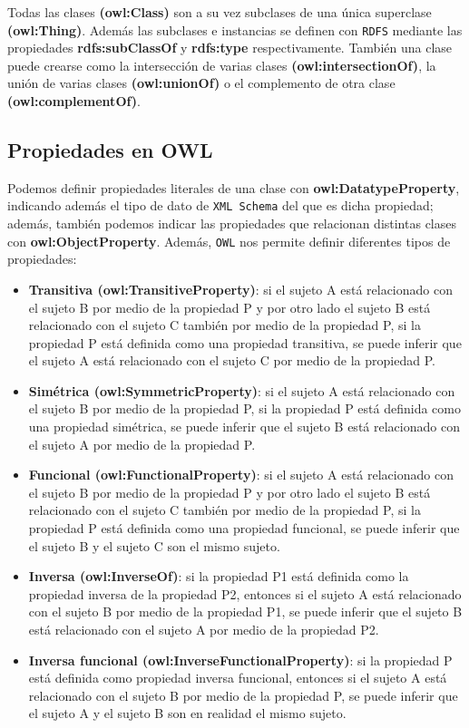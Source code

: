\bigskip

Todas las clases \textbf{(owl:Class)} son a su vez subclases de una única superclase \textbf{(owl:Thing)}. Además las subclases e instancias se definen con {\tt RDFS} mediante las propiedades \textbf{rdfs:subClassOf} y \textbf{rdfs:type} respectivamente. También una clase puede crearse como la intersección de varias clases \textbf{(owl:intersectionOf)}, la unión de varias clases \textbf{(owl:unionOf)} o el complemento de otra clase \textbf{(owl:complementOf)}.

\subsection{Propiedades en OWL}	

Podemos definir propiedades literales de una clase con \textbf{owl:DatatypeProperty}, indicando además el tipo de dato de {\tt XML Schema} del que es dicha propiedad; además, también podemos indicar las propiedades que relacionan distintas clases con \textbf{owl:ObjectProperty}. Además, {\tt OWL}  nos permite definir diferentes tipos de propiedades:

	\begin{itemize}
		\item \textbf{Transitiva (owl:TransitiveProperty)}: si el sujeto A está relacionado con el sujeto B por medio de la propiedad P y por otro lado el sujeto B está relacionado con el sujeto C también por medio de la propiedad P, si la propiedad P está definida como una propiedad transitiva, se puede inferir que el sujeto A está relacionado con el sujeto C por medio de la propiedad P.
		\item \textbf{Simétrica (owl:SymmetricProperty)}: si el sujeto A está relacionado con el sujeto B por medio de la propiedad P, si la propiedad P está definida como una propiedad simétrica, se puede inferir que el sujeto B está relacionado con el sujeto A por medio de la propiedad P.
		\item \textbf{Funcional (owl:FunctionalProperty)}: si el sujeto A está relacionado con el sujeto B por medio de la propiedad P y por otro lado el sujeto B está relacionado con el sujeto C también por medio de la propiedad P, si la propiedad P está definida como una propiedad funcional, se puede inferir que el sujeto B y el sujeto C son el mismo sujeto.
		\item \textbf{Inversa (owl:InverseOf)}: si la propiedad P1 está definida como la propiedad inversa de la propiedad P2, entonces si el sujeto A está relacionado con el sujeto B por medio de la propiedad P1, se puede inferir que el sujeto B está relacionado con el sujeto A por medio de la propiedad P2.
		\item \textbf{Inversa funcional (owl:InverseFunctionalProperty)}: si la propiedad P está definida como propiedad inversa funcional, entonces si el sujeto A está relacionado con el sujeto B por medio de la propiedad P, se puede inferir que el sujeto A y el sujeto B son en realidad el mismo sujeto.
	\end{itemize}

